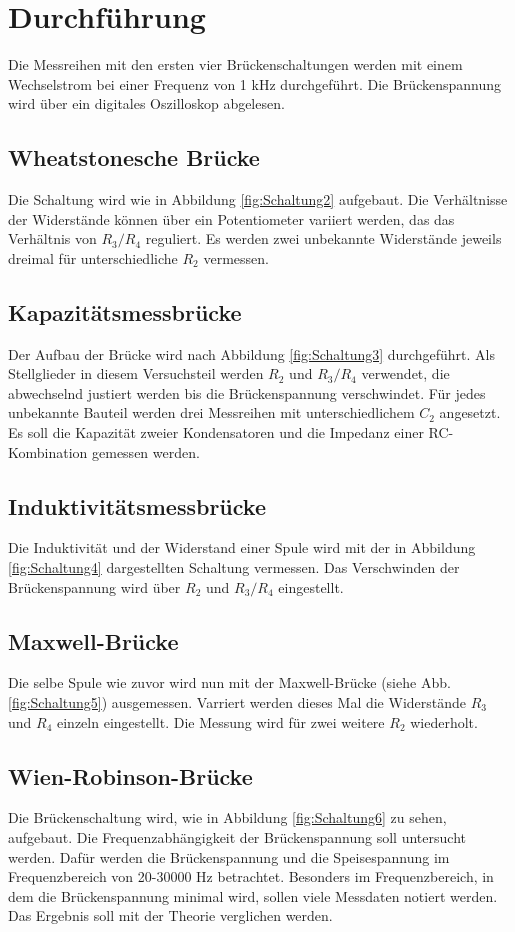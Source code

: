 \section{Durchführung}
\label{sec:Durchführung}

Die Messreihen mit den ersten vier Brückenschaltungen werden mit einem Wechselstrom bei einer Frequenz von 1 kHz durchgeführt.
Die Brückenspannung wird über ein digitales Oszilloskop abgelesen.

\subsection{Wheatstonesche Brücke}

Die Schaltung wird wie in Abbildung \ref{fig:Schaltung2} aufgebaut.
Die Verhältnisse der Widerstände können über ein Potentiometer variiert werden, das das Verhältnis von $R_3/R_4$ reguliert.
Es werden zwei unbekannte Widerstände jeweils dreimal für unterschiedliche $R_2$ vermessen.

\subsection{Kapazitätsmessbrücke}

Der Aufbau der Brücke wird nach Abbildung \ref{fig:Schaltung3} durchgeführt.
Als Stellglieder in diesem Versuchsteil werden $R_2$ und $R_3/R_4$ verwendet, die abwechselnd justiert werden bis die Brückenspannung verschwindet.
Für jedes unbekannte Bauteil werden drei Messreihen mit unterschiedlichem $C_2$ angesetzt.
Es soll die Kapazität zweier Kondensatoren und die Impedanz einer RC-Kombination gemessen werden.

\subsection{Induktivitätsmessbrücke}

Die Induktivität und der Widerstand einer Spule wird mit der in Abbildung \ref{fig:Schaltung4} dargestellten Schaltung vermessen.
Das Verschwinden der Brückenspannung wird über $R_2$ und $R_3/R_4$ eingestellt.

\subsection{Maxwell-Brücke}

Die selbe Spule wie zuvor wird nun mit der Maxwell-Brücke (siehe Abb. \ref{fig:Schaltung5}) ausgemessen.
Varriert werden dieses Mal die Widerstände $R_3$ und $R_4$ einzeln eingestellt.
Die Messung wird für zwei weitere $R_2$ wiederholt.

\subsection{Wien-Robinson-Brücke}

Die Brückenschaltung wird, wie in Abbildung \ref{fig:Schaltung6} zu sehen, aufgebaut.
Die Frequenzabhängigkeit der Brückenspannung soll untersucht werden.
Dafür werden die Brückenspannung und  die Speisespannung im Frequenzbereich von 20-30000 Hz betrachtet.
Besonders im Frequenzbereich, in dem die Brückenspannung minimal wird, sollen viele Messdaten notiert werden.
Das Ergebnis soll mit der Theorie verglichen werden.
